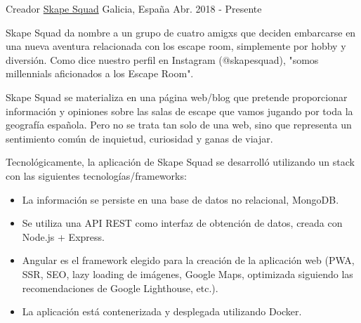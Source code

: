 
\begin{cventries}
  \cventry
    {Creador}
    {\href{https://skapesquad.com}{Skape Squad}}
    {Galicia, España}
    {Abr. 2018 - Presente}
    {
      \begin{cvitems}
        \item {Skape Squad da nombre a un grupo de cuatro amigxs que deciden embarcarse en una nueva aventura relacionada con los escape room, simplemente por hobby y diversión. Como dice nuestro perfil en Instagram (@skapesquad), "somos millennials aficionados a los Escape Room".}
        \item {Skape Squad se materializa en una página web/blog que pretende proporcionar información y opiniones sobre las salas de escape que vamos jugando por toda la geografía española. Pero no se trata tan solo de una web, sino que representa un sentimiento común de inquietud, curiosidad y ganas de viajar.}
        \item {Tecnológicamente, la aplicación de Skape Squad se desarrolló utilizando un stack con las siguientes tecnologías/frameworks:}
          \begin{itemize}[label={---}]
            \item {La información se persiste en una base de datos no relacional, MongoDB.}
            \item {Se utiliza una API REST como interfaz de obtención de datos, creada con Node.js + Express.}
            \item {Angular es el framework elegido para la creación de la aplicación web (PWA, SSR, SEO, lazy loading de imágenes, Google Maps, optimizada siguiendo las recomendaciones de Google Lighthouse, etc.).}
            \item {La aplicación está contenerizada y desplegada utilizando Docker.}
          \end{itemize}
      \end{cvitems}
    }


\end{cventries}

